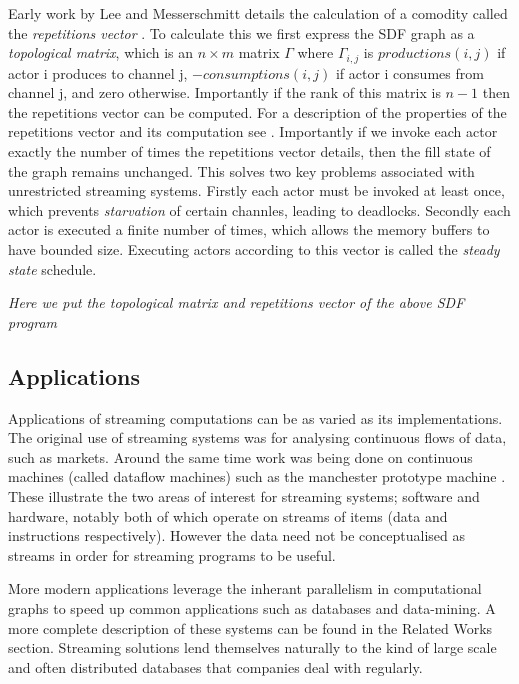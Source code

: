 Early work by Lee and Messerschmitt details the calculation of a comodity called the {\em repetitions vector} \cite{lee87}.
To calculate this we first express the SDF graph as a {\em topological matrix}, which is an $n \times m$ matrix $\Gamma$ where $\Gamma_{i,j}$ is $productions(i, j)$ if actor i produces to channel j, $-consumptions(i, j)$ if actor i consumes from channel j, and zero otherwise.
Importantly if the rank of this matrix is $n-1$ then the repetitions vector can be computed.
For a description of the properties of the repetitions vector and its computation see \cite{sdfBook}.
Importantly if we invoke each actor exactly the number of times the repetitions vector details, then the fill state of the graph remains unchanged.
This solves two key problems associated with unrestricted streaming systems.
Firstly each actor must be invoked at least once, which prevents {\em starvation} of certain channles, leading to deadlocks.
Secondly each actor is executed a finite number of times, which allows the memory buffers to have bounded size.
Executing actors according to this vector is called the {\em steady state} schedule.

{\em Here we put the topological matrix and repetitions vector of the above SDF program}

\subsection{Applications}

Applications of streaming computations can be as varied as its implementations.
The original use of streaming systems was for analysing continuous flows of data, such as markets.
Around the same time work was being done on continuous machines (called dataflow machines) such as the manchester prototype machine \cite{gur85}.
These illustrate the two areas of interest for streaming systems; software and hardware, notably both of which operate on streams of items (data and instructions respectively).
However the data need not be conceptualised as streams in order for streaming programs to be useful.

More modern applications leverage the inherant parallelism in computational graphs to speed up common applications such as databases and data-mining.
A more complete description of these systems can be found in the Related Works section.
Streaming solutions lend themselves naturally to the kind of large scale and often distributed databases that companies deal with regularly.

